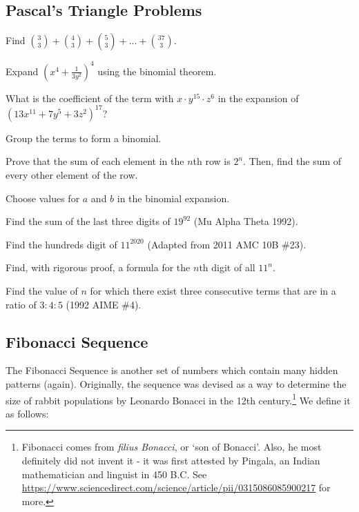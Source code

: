 \documentclass[11pt]{article}
\newcommand{\important}{$\blacktriangleright\,$}
\begin{document}
\subsection*{Pascal's Triangle Problems}
\begin{problem}[10]
    Find $\binom{3}{3}+\binom{4}{3} + \binom{5}{3} + \dots + \binom{37}{3}$.
\end{problem}
\begin{problem}[15]
    Expand $(x^4 + \frac{1}{3y^2})^4$ using the binomial theorem.
\end{problem}
\begin{problem}[\important 20]
    What is the coefficient of the term with $x\cdot y^{15}\cdot z^{6}$ in the expansion of $\left(13x^{11}+7y^{5}+3z^{2}\right)^{17}$?
    \begin{hint}
        Group the terms to form a binomial.
    \end{hint}
\end{problem}
\begin{problem}[25]
    Prove that the sum of each element in the $n$th row is $2^n$. Then, find the sum of every other element of the row.
    \begin{hint}
        Choose values for $a$ and $b$ in the binomial expansion.
    \end{hint}
\end{problem}
\begin{problem}[30]
    Find the sum of the last three digits of $19^{92}$ (Mu Alpha Theta 1992).
\end{problem}
\begin{problem}[30]
    Find the hundreds digit of $11^{2020}$ (Adapted from 2011 AMC 10B \#23).
\end{problem}
\begin{problem}[35]
    Find, with rigorous proof, a formula for the $n$th digit of all $11^n$.
\end{problem}
\begin{problem}[\important 30]
    Find the value of $n$ for which there exist three consecutive terms that are in a ratio of $3: 4: 5$ (1992 AIME \#4).
\end{problem}

\subsection{Fibonacci Sequence}
The Fibonacci Sequence is another set of numbers which contain many hidden patterns (again). Originally, the sequence was devised as a way to determine the size of rabbit populations by Leonardo Bonacci in the 12th century.\footnote{Fibonacci comes from \textit{filius Bonacci}, or `son of Bonacci'. Also, he most definitely did not invent it - it was first attested by Pingala, an Indian mathematician and linguist in 450 B.C. See \url{https://www.sciencedirect.com/science/article/pii/0315086085900217} for more.} We define it as follows:
\end{document}
